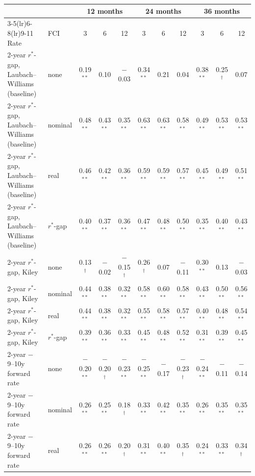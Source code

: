 \begin{tabular}{llccccccccc}
\toprule
 & & \multicolumn{3}{c}{12 months} & \multicolumn{3}{c}{24 months} & \multicolumn{3}{c}{36 months}\\
\cmidrule(lr){3-5}\cmidrule(lr){6-8}\cmidrule(lr){9-11}
Rate & FCI & 3 & 6 & 12 & 3 & 6 & 12 & 3 & 6 & 12 \\
\midrule
2-year $r^*$-gap, Laubach--Williams (baseline) & none & 0.19$^{**}$ & 0.10 & $-$0.03 & 0.34$^{**}$ & 0.21 & 0.04 & 0.38$^{**}$ & 0.25$^{\dagger}$ & 0.07 \\
2-year $r^*$-gap, Laubach--Williams (baseline) & nominal & 0.48$^{**}$ & 0.43$^{**}$ & 0.35$^{**}$ & 0.63$^{**}$ & 0.63$^{**}$ & 0.58$^{**}$ & 0.49$^{**}$ & 0.53$^{**}$ & 0.53$^{**}$ \\
2-year $r^*$-gap, Laubach--Williams (baseline) & real & 0.46$^{**}$ & 0.42$^{**}$ & 0.36$^{**}$ & 0.59$^{**}$ & 0.59$^{**}$ & 0.57$^{**}$ & 0.45$^{**}$ & 0.49$^{**}$ & 0.51$^{**}$ \\
2-year $r^*$-gap, Laubach--Williams (baseline) & $r^*$-gap & 0.40$^{**}$ & 0.37$^{**}$ & 0.36$^{**}$ & 0.47$^{**}$ & 0.48$^{**}$ & 0.50$^{**}$ & 0.35$^{**}$ & 0.40$^{**}$ & 0.43$^{**}$ \\
\midrule
2-year $r^*$-gap, Kiley & none & 0.13$^{\dagger}$ & $-$0.02 & $-$0.15$^{\dagger}$ & 0.26$^{\dagger}$ & 0.07 & $-$0.11 & 0.30$^{**}$ & 0.13 & $-$0.03 \\
2-year $r^*$-gap, Kiley & nominal & 0.44$^{**}$ & 0.38$^{**}$ & 0.32$^{**}$ & 0.58$^{**}$ & 0.60$^{**}$ & 0.58$^{**}$ & 0.43$^{**}$ & 0.50$^{**}$ & 0.56$^{**}$ \\
2-year $r^*$-gap, Kiley & real & 0.44$^{**}$ & 0.38$^{**}$ & 0.32$^{**}$ & 0.55$^{**}$ & 0.58$^{**}$ & 0.57$^{**}$ & 0.40$^{**}$ & 0.48$^{**}$ & 0.54$^{**}$ \\
2-year $r^*$-gap, Kiley & $r^*$-gap & 0.39$^{**}$ & 0.36$^{**}$ & 0.33$^{**}$ & 0.45$^{**}$ & 0.48$^{**}$ & 0.52$^{**}$ & 0.31$^{**}$ & 0.39$^{**}$ & 0.45$^{**}$ \\
\midrule
2-year $-$ 9--10y forward rate & none & $-$0.20$^{**}$ & $-$0.20$^{\dagger}$ & $-$0.23$^{**}$ & $-$0.25$^{**}$ & $-$0.17 & $-$0.23$^{\dagger}$ & $-$0.24$^{**}$ & $-$0.11 & $-$0.14 \\
2-year $-$ 9--10y forward rate & nominal & 0.26$^{**}$ & 0.25$^{**}$ & 0.18$^{\dagger}$ & 0.33$^{**}$ & 0.42$^{**}$ & 0.35$^{**}$ & 0.26$^{**}$ & 0.35$^{**}$ & 0.35$^{**}$ \\
2-year $-$ 9--10y forward rate & real & 0.26$^{**}$ & 0.26$^{**}$ & 0.20$^{\dagger}$ & 0.31$^{**}$ & 0.40$^{**}$ & 0.35$^{\dagger}$ & 0.24$^{**}$ & 0.33$^{**}$ & 0.34$^{\dagger}$ \\

\end{tabular}
